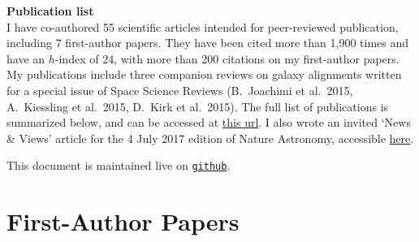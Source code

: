 \documentclass{article}
\renewcommand{\title}[1]{\noindent\textbf{\huge #1}\\}
\begin{document}
% 

\title{Publication list}

\noindent
I have co-authored 55 scientific articles intended for peer-reviewed publication,
including 7 first-author papers. They have been cited more than 1,900 times and 
have an $h$-index of 24, with more than 200 citations on my first-author papers. 
My publications include three companion reviews on galaxy alignments written for a 
special issue of Space Science Reviews (B.\ Joachimi et al.\ 2015, A.\ Kiessling 
et al.\ 2015, D.\ Kirk et al.\ 2015). The full list of publications is summarized 
below, and can be accessed at \href{https://goo.gl/LAu9G4}{this url}. I also wrote 
an invited `News \& Views' article for the 4 July 2017 edition of Nature 
Astronomy, accessible 
\href{https://www.nature.com/articles/s41550-017-0181}{here}.

This document is maintained live on 
\href{https://github.com/cristobal-sifon/cv/blob/master/Sifon_publications.pdf}{\texttt{github}}.


\section*{First-Author Papers}
\end{document}
